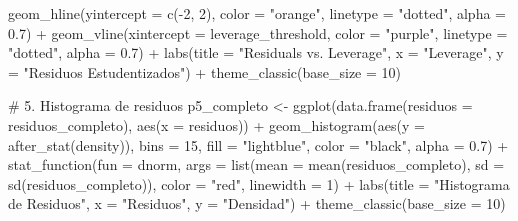 \documentclass[
  letterpaper,
  DIV=11,
  numbers=noendperiod]{scrreprt}
\newenvironment{Shaded}{\begin{snugshade}}{\end{snugshade}}
\newcommand{\AttributeTok}[1]{\textcolor[rgb]{0.40,0.45,0.13}{#1}}
\newcommand{\CommentTok}[1]{\textcolor[rgb]{0.37,0.37,0.37}{#1}}
\newcommand{\DecValTok}[1]{\textcolor[rgb]{0.68,0.00,0.00}{#1}}
\newcommand{\FloatTok}[1]{\textcolor[rgb]{0.68,0.00,0.00}{#1}}
\newcommand{\FunctionTok}[1]{\textcolor[rgb]{0.28,0.35,0.67}{#1}}
\newcommand{\NormalTok}[1]{\textcolor[rgb]{0.00,0.23,0.31}{#1}}
\newcommand{\OtherTok}[1]{\textcolor[rgb]{0.00,0.23,0.31}{#1}}
\newcommand{\SpecialCharTok}[1]{\textcolor[rgb]{0.37,0.37,0.37}{#1}}
\newcommand{\StringTok}[1]{\textcolor[rgb]{0.13,0.47,0.30}{#1}}
\begin{document}
\begin{tcolorbox}
\begin{Shaded}
\begin{Highlighting}[]
  \FunctionTok{geom\_hline}\NormalTok{(}\AttributeTok{yintercept =} \FunctionTok{c}\NormalTok{(}\SpecialCharTok{{-}}\DecValTok{2}\NormalTok{, }\DecValTok{2}\NormalTok{), }\AttributeTok{color =} \StringTok{"orange"}\NormalTok{, }\AttributeTok{linetype =} \StringTok{"dotted"}\NormalTok{, }\AttributeTok{alpha =} \FloatTok{0.7}\NormalTok{) }\SpecialCharTok{+}
  \FunctionTok{geom\_vline}\NormalTok{(}\AttributeTok{xintercept =}\NormalTok{ leverage\_threshold, }\AttributeTok{color =} \StringTok{"purple"}\NormalTok{, }\AttributeTok{linetype =} \StringTok{"dotted"}\NormalTok{, }\AttributeTok{alpha =} \FloatTok{0.7}\NormalTok{) }\SpecialCharTok{+}
  \FunctionTok{labs}\NormalTok{(}\AttributeTok{title =} \StringTok{"Residuals vs. Leverage"}\NormalTok{, }\AttributeTok{x =} \StringTok{"Leverage"}\NormalTok{, }\AttributeTok{y =} \StringTok{"Residuos Estudentizados"}\NormalTok{) }\SpecialCharTok{+}
  \FunctionTok{theme\_classic}\NormalTok{(}\AttributeTok{base\_size =} \DecValTok{10}\NormalTok{)}

\CommentTok{\# 5. Histograma de residuos}
\NormalTok{p5\_completo }\OtherTok{\textless{}{-}} \FunctionTok{ggplot}\NormalTok{(}\FunctionTok{data.frame}\NormalTok{(}\AttributeTok{residuos =}\NormalTok{ residuos\_completo), }\FunctionTok{aes}\NormalTok{(}\AttributeTok{x =}\NormalTok{ residuos)) }\SpecialCharTok{+}
  \FunctionTok{geom\_histogram}\NormalTok{(}\FunctionTok{aes}\NormalTok{(}\AttributeTok{y =} \FunctionTok{after\_stat}\NormalTok{(density)), }\AttributeTok{bins =} \DecValTok{15}\NormalTok{, }\AttributeTok{fill =} \StringTok{"lightblue"}\NormalTok{, }
                 \AttributeTok{color =} \StringTok{"black"}\NormalTok{, }\AttributeTok{alpha =} \FloatTok{0.7}\NormalTok{) }\SpecialCharTok{+}
  \FunctionTok{stat\_function}\NormalTok{(}\AttributeTok{fun =}\NormalTok{ dnorm, }
                \AttributeTok{args =} \FunctionTok{list}\NormalTok{(}\AttributeTok{mean =} \FunctionTok{mean}\NormalTok{(residuos\_completo), }\AttributeTok{sd =} \FunctionTok{sd}\NormalTok{(residuos\_completo)),}
                \AttributeTok{color =} \StringTok{"red"}\NormalTok{, }\AttributeTok{linewidth =} \DecValTok{1}\NormalTok{) }\SpecialCharTok{+}
  \FunctionTok{labs}\NormalTok{(}\AttributeTok{title =} \StringTok{"Histograma de Residuos"}\NormalTok{, }\AttributeTok{x =} \StringTok{"Residuos"}\NormalTok{, }\AttributeTok{y =} \StringTok{"Densidad"}\NormalTok{) }\SpecialCharTok{+}
  \FunctionTok{theme\_classic}\NormalTok{(}\AttributeTok{base\_size =} \DecValTok{10}\NormalTok{)}


\end{Highlighting}
\end{Shaded}
\end{tcolorbox}
\end{document}
